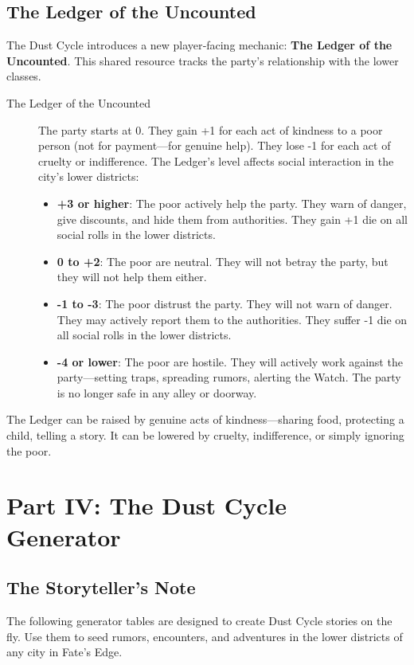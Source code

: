 \documentclass[11pt]{article}
\begin{document}
\subsection{The Ledger of the Uncounted}
The Dust Cycle introduces a new player‑facing mechanic: \textbf{The Ledger of the Uncounted}. This shared resource tracks the party’s relationship with the lower classes.

\begin{description}
\item[The Ledger of the Uncounted] The party starts at 0. They gain +1 for each act of kindness to a poor person (not for payment—for genuine help). They lose -1 for each act of cruelty or indifference. The Ledger’s level affects social interaction in the city’s lower districts:
\begin{itemize}
\item \textbf{+3 or higher}: The poor actively help the party. They warn of danger, give discounts, and hide them from authorities. They gain +1 die on all social rolls in the lower districts.
\item \textbf{0 to +2}: The poor are neutral. They will not betray the party, but they will not help them either.
\item \textbf{-1 to -3}: The poor distrust the party. They will not warn of danger. They may actively report them to the authorities. They suffer -1 die on all social rolls in the lower districts.
\item \textbf{-4 or lower}: The poor are hostile. They will actively work against the party—setting traps, spreading rumors, alerting the Watch. The party is no longer safe in any alley or doorway.
\end{itemize}
\end{description}

The Ledger can be raised by genuine acts of kindness—sharing food, protecting a child, telling a story. It can be lowered by cruelty, indifference, or simply ignoring the poor.

\section{Part IV: The Dust Cycle Generator}
\subsection{The Storyteller's Note}
The following generator tables are designed to create Dust Cycle stories on the fly. Use them to seed rumors, encounters, and adventures in the lower districts of any city in Fate’s Edge.
\end{document}
